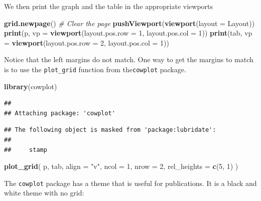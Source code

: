 \documentclass[
]{book}
\newenvironment{Shaded}{\begin{snugshade}}{\end{snugshade}}
\newcommand{\AttributeTok}[1]{\textcolor[rgb]{0.13,0.29,0.53}{#1}}
\newcommand{\CommentTok}[1]{\textcolor[rgb]{0.56,0.35,0.01}{\textit{#1}}}
\newcommand{\DecValTok}[1]{\textcolor[rgb]{0.00,0.00,0.81}{#1}}
\newcommand{\FunctionTok}[1]{\textcolor[rgb]{0.13,0.29,0.53}{\textbf{#1}}}
\newcommand{\NormalTok}[1]{#1}
\newcommand{\StringTok}[1]{\textcolor[rgb]{0.31,0.60,0.02}{#1}}
\begin{document}
We then print the graph and the table in the appropriate viewports

\begin{Shaded}
\begin{Highlighting}[]
\FunctionTok{grid.newpage}\NormalTok{() }\CommentTok{\# Clear the page}
\FunctionTok{pushViewport}\NormalTok{(}\FunctionTok{viewport}\NormalTok{(}\AttributeTok{layout =}\NormalTok{ Layout))}
\FunctionTok{print}\NormalTok{(p, }\AttributeTok{vp =} \FunctionTok{viewport}\NormalTok{(}\AttributeTok{layout.pos.row =} \DecValTok{1}\NormalTok{, }\AttributeTok{layout.pos.col =} \DecValTok{1}\NormalTok{))}
\FunctionTok{print}\NormalTok{(tab, }\AttributeTok{vp =} \FunctionTok{viewport}\NormalTok{(}\AttributeTok{layout.pos.row =} \DecValTok{2}\NormalTok{, }\AttributeTok{layout.pos.col =} \DecValTok{1}\NormalTok{))}
\end{Highlighting}
\end{Shaded}

Notice that the left margins do not match. One way to get the margins to match is to use the \texttt{plot\_grid}
function from the\texttt{cowplot} package.

\begin{Shaded}
\begin{Highlighting}[]
\FunctionTok{library}\NormalTok{(cowplot)}
\end{Highlighting}
\end{Shaded}

\begin{verbatim}
## 
## Attaching package: 'cowplot'
\end{verbatim}

\begin{verbatim}
## The following object is masked from 'package:lubridate':
## 
##     stamp
\end{verbatim}

\begin{Shaded}
\begin{Highlighting}[]
\FunctionTok{plot\_grid}\NormalTok{(}
\NormalTok{  p, }
\NormalTok{  tab, }
  \AttributeTok{align =} \StringTok{"v"}\NormalTok{, }
  \AttributeTok{ncol =} \DecValTok{1}\NormalTok{, }
  \AttributeTok{nrow =} \DecValTok{2}\NormalTok{, }
  \AttributeTok{rel\_heights =} \FunctionTok{c}\NormalTok{(}\DecValTok{5}\NormalTok{, }\DecValTok{1}\NormalTok{)}
\NormalTok{)}
\end{Highlighting}
\end{Shaded}

The \texttt{cowplot} package has a theme that is useful for publications. It is a black and white theme with no grid:
\end{document}
